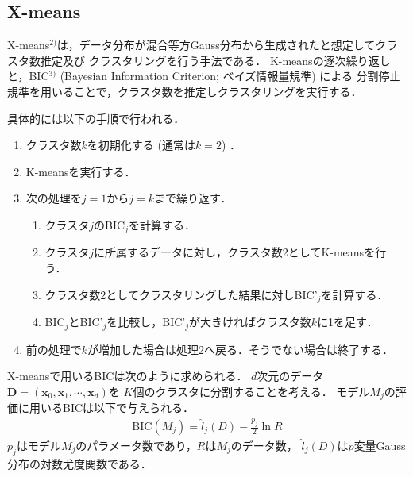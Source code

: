\documentclass[10pt,a4j]{ltjsarticle}
\begin{document}
\subsection{X-means}
X-means$^{2)}$は，データ分布が混合等方Gauss分布から生成されたと想定してクラスタ数推定及び
クラスタリングを行う手法である．
K-meansの逐次繰り返しと，BIC$^{3)}$ (Bayesian Information Criterion; ベイズ情報量規準) による
分割停止規準を用いることで，クラスタ数を推定しクラスタリングを実行する．

具体的には以下の手順で行われる．
\begin{enumerate}
    \item クラスタ数$k$を初期化する (通常は$k=2$) ．
    \item K-meansを実行する．
    \item 次の処理を$j=1$から$j=k$まで繰り返す．
    \begin{enumerate}
        \item クラスタ$j$のBIC$_j$を計算する．
        \item クラスタ$j$に所属するデータに対し，クラスタ数2としてK-meansを行う．
        \item クラスタ数2としてクラスタリングした結果に対しBIC'$_j$を計算する．
        \item BIC$_j$とBIC'$_j$を比較し，BIC'$_j$が大きければクラスタ数$k$に1を足す．
    \end{enumerate}
    \item 前の処理で$k$が増加した場合は処理2へ戻る．そうでない場合は終了する．
\end{enumerate}

X-meansで用いるBICは次のように求められる．
$d$次元のデータ${\bm D}=({\bm x_0}, {\bm x_1}, \cdots, {\bm x_d})$を
$K$個のクラスタに分割することを考える．
モデル$M_j$の評価に用いるBICは以下で与えられる．
\begin{align}
  \label{eq:bic}
  \mathrm{BIC}(M_j) = \hat{l}_j(D) - \frac{p_j}{2}\ln R
\end{align}
$p_j$はモデル$M_j$のパラメータ数であり，$R$は$M_j$のデータ数，
$\hat{l}_j(D)$は$p$変量Gauss分布の対数尤度関数である．
\end{document}

